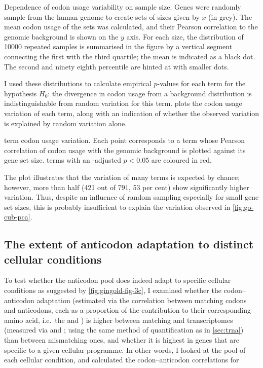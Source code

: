     {Dependence of codon usage variability on sample size.}
    {Genes were randomly sample from the human genome to create sets of sizes
    given by \(x\) (in grey). The mean codon usage of the sets was calculated,
    and their Pearson correlation to the genomic background is shown on the
    \(y\) axis. For each size, the distribution of \num{10000} repeated samples
    is summarised in the figure by a vertical segment connecting the first with
    the third quartile; the mean is indicated as a black dot. The second and
    ninety eighth percentile are hinted at with smaller dots.}

I used these distributions to calculate empirical \(p\)-values for each \go term
for the hypothesis \(H_0\): the divergence in codon usage from a background
distribution is indistinguishable from random variation for this \go term.
 plots the codon usage variation of each
\go term, along with an indication of whether the observed variation is
explained by random variation alone.

    {\go term codon usage variation.}
    {Each point corresponds to a \go term whose Pearson correlation of codon
    usage with the genomic background is plotted against its gene set size.
    \go terms with an \fdr-adjusted \(p < 0.05\) are coloured in red.}

The plot illustrates that the variation of many \go terms is expected by chance;
however, more than half (\num{421} out of \num{791}, \num{53} per cent) show
significantly higher variation. Thus, despite an influence of random sampling
especially for small gene set sizes, this is probably insufficient to explain
the variation observed in \cref{fig:go-cub-pca}.

\subsection{The extent of anticodon adaptation to distinct cellular conditions}

To test whether the anticodon pool does indeed adapt to specific cellular
conditions as suggested by \cref{fig:gingold-fig-3c}, I examined whether the
codon--anticodon adaptation (estimated via the correlation between matching
codons and anticodons, each as a proportion of the contribution to their
corresponding amino acid, i.e.\ the \rcu and \raa) is higher between matching
\mrna and \trna transcriptomes (measured via \rnaseq and  \chipseq; using
the same method of quantification as in \cref{sec:trna}) than between
mismatching ones, and whether it is highest in genes that are specific to a
given cellular programme. In other words, I looked at the \mrna pool of each
cellular condition, and calculated the codon--anticodon correlations for

